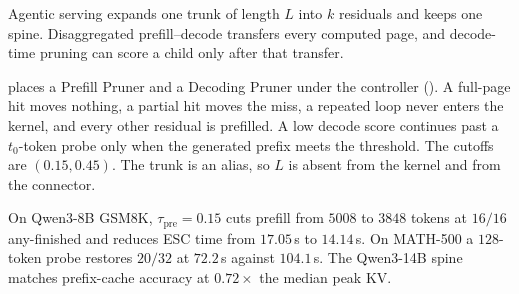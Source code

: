 Agentic serving expands one trunk of length $L$ into $k$ residuals and keeps one spine.
Disaggregated prefill--decode transfers every computed page, and decode-time pruning can score a child only after that transfer.

\sys places a Prefill Pruner and a Decoding Pruner under the controller ().
A full-page hit moves nothing, a partial hit moves the miss, a repeated loop never enters the kernel, and every other residual is prefilled.
A low decode score continues past a $t_0$-token probe only when the generated prefix meets the threshold.
The cutoffs are $(0.15, 0.45)$.
The trunk is an alias, so $L$ is absent from the kernel and from the connector.

On Qwen3-8B GSM8K, $\tau_{\mathrm{pre}}{=}0.15$ cuts prefill from $5008$ to $3848$ tokens at $16/16$ any-finished and reduces ESC time from $17.05$\,s to $14.14$\,s.
On MATH-500 a $128$-token probe restores $20/32$ at $72.2$\,s against $104.1$\,s.
The Qwen3-14B spine matches prefix-cache accuracy at $0.72\times$ the median peak KV.
